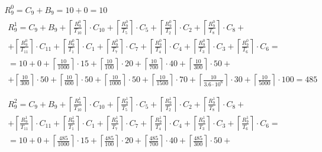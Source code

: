 \begin{gather*}
  R_9^0 = C_9 + B_9 = 10 + 0 = 10 \\
  \begin{multlined}
    R_9^1 = C_9 + B_9 + \left\lceil\frac{R_9^0}{T_{10}}\right\rceil\cdot C_{10} + %
    \left\lceil\frac{R_9^0}{T_5}\right\rceil\cdot C_5 + %
    \left\lceil\frac{R_9^0}{T_2}\right\rceil\cdot C_2 + %
    \left\lceil\frac{R_9^0}{T_8}\right\rceil\cdot C_8 + \\%
    + \left\lceil\frac{R_9^0}{T_{11}}\right\rceil\cdot C_{11} + %
    \left\lceil\frac{R_9^0}{T_1}\right\rceil\cdot C_1 +%
    \left\lceil\frac{R_9^0}{T_7}\right\rceil\cdot C_7 +%
    \left\lceil\frac{R_9^0}{T_4}\right\rceil\cdot C_4 +%
    \left\lceil\frac{R_9^0}{T_3}\right\rceil\cdot C_3 +%
    \left\lceil\frac{R_9^0}{T_6}\right\rceil\cdot C_6 = \\%
    = 10 + 0 + \left\lceil\frac{10}{1000}\right\rceil\cdot 15 + %
    \left\lceil\frac{10}{100}\right\rceil\cdot 20 + %
    \left\lceil\frac{10}{700}\right\rceil\cdot 40 + %
    \left\lceil\frac{10}{300}\right\rceil\cdot 50 + \\%
    + \left\lceil\frac{10}{300}\right\rceil\cdot 50 + %
    \left\lceil\frac{10}{600}\right\rceil\cdot 50 + %
    \left\lceil\frac{10}{1000}\right\rceil\cdot 50 +%
    \left\lceil\frac{10}{1500}\right\rceil\cdot 70 +%
    \left\lceil\frac{10}{3.6 \cdot 10^6}\right\rceil\cdot 30 +%
    \left\lceil\frac{10}{5000}\right\rceil\cdot 100 = 485 \\
  \end{multlined} \\
  \begin{multlined}
    R_9^2 = C_9 + B_9 + \left\lceil\frac{R_9^1}{T_{10}}\right\rceil\cdot C_{10} + %
    \left\lceil\frac{R_9^1}{T_5}\right\rceil\cdot C_5 + %
    \left\lceil\frac{R_9^1}{T_2}\right\rceil\cdot C_2 + %
    \left\lceil\frac{R_9^1}{T_8}\right\rceil\cdot C_8 + \\%
    + \left\lceil\frac{R_9^1}{T_{11}}\right\rceil\cdot C_{11} + %
    \left\lceil\frac{R_9^1}{T_1}\right\rceil\cdot C_1 +%
    \left\lceil\frac{R_9^1}{T_7}\right\rceil\cdot C_7 +%
    \left\lceil\frac{R_9^1}{T_4}\right\rceil\cdot C_4 +%
    \left\lceil\frac{R_9^1}{T_3}\right\rceil\cdot C_3 +%
    \left\lceil\frac{R_9^1}{T_6}\right\rceil\cdot C_6 = \\%
    = 10 + 0 + \left\lceil\frac{485}{1000}\right\rceil\cdot 15 + %
    \left\lceil\frac{485}{100}\right\rceil\cdot 20 + %
    \left\lceil\frac{485}{700}\right\rceil\cdot 40 + %
    \left\lceil\frac{485}{300}\right\rceil\cdot 50 + \\%

\end{multlined}
\end{gather*}
